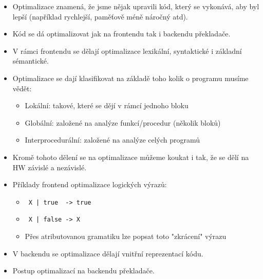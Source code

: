 \documentclass{article}
\begin{document}
\begin{itemize}
    \item Optimalizace znamená, že jsme nějak upravili kód, který se vykonává, aby byl lepší (například rychlejší, paměťově méně náročný atd).
    \item Kód se dá optimalizovat jak na frontendu tak i backendu překladače. 
    \item V rámci frontendu se dělají optimalizace lexikální, syntaktické i základní sémantické.
    \item Optimalizace se dají klasifikovat na základě toho kolik o programu musíme vědět:
    \begin{itemize}
        \item Lokální: takové, které se dějí v rámcí jednoho bloku
        \item Globální: založené na analýze funkcí/procedur (několik bloků)
        \item Interprocedurální: založené na analýze celých programů
    \end{itemize}
    \item Kromě tohoto dělení se na optimalizace můžeme koukat i tak, že se dělí na HW závislé a nezávislé.
    \item Příklady frontend optimalizace logických výrazů:
    \begin{itemize}
        \item \verb. X | true  -> true.
        \item \verb. X | false -> X .
        \item Přes atributovanou gramatiku lze popsat toto "zkrácení" výrazu
    \end{itemize}
    \item V backendu se optimalizace dělají vnitřní reprezentací kódu. 
    \item Postup optimalizací na backendu překladače.
    

\end{itemize}
\end{document}
